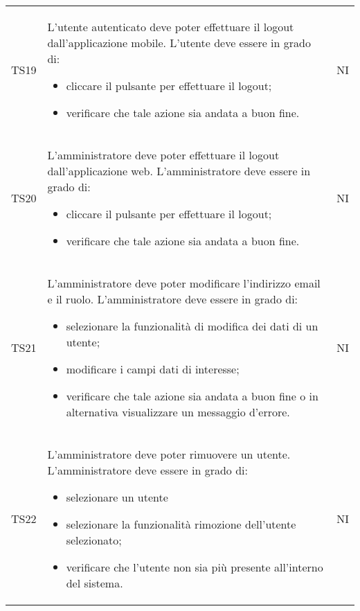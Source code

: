 {\begin{longtable}{ c C{11cm} c }
        TS19&
        \begin{flushleft}
            L'utente autenticato deve poter effettuare il logout dall'applicazione mobile.
            L'utente deve essere in grado di:
        \end{flushleft}
        \begin{itemize}
            \item cliccare il pulsante per effettuare il logout;
            \item verificare che tale azione sia andata a buon fine.
        \end{itemize}&
        NI\\

        TS20&
        \begin{flushleft}
            L'amministratore deve poter effettuare il logout dall'applicazione web.
            L'amministratore deve essere in grado di:
        \end{flushleft}
        \begin{itemize}
            \item cliccare il pulsante per effettuare il logout;
            \item verificare che tale azione sia andata a buon fine.
        \end{itemize}&
        NI\\

  
        TS21&
        \begin{flushleft}
            L'amministratore deve poter modificare l'indirizzo email e il ruolo.
            L'amministratore deve essere in grado di:
        \end{flushleft}
        \begin{itemize}
            \item selezionare la funzionalità di modifica dei dati di un utente;
            \item modificare i campi dati di interesse;
            \item verificare che tale azione sia andata a buon fine o in alternativa visualizzare un messaggio d'errore.
        \end{itemize}&
        NI\\

        TS22&
        \begin{flushleft}
            L'amministratore deve poter rimuovere un utente.
            L'amministratore deve essere in grado di:
        \end{flushleft}
        \begin{itemize}
            \item selezionare un utente
            \item selezionare la funzionalità rimozione dell'utente selezionato;
            \item verificare che l'utente non sia più presente all'interno del sistema.
        \end{itemize}&
        NI\\
        

\end{longtable}}

